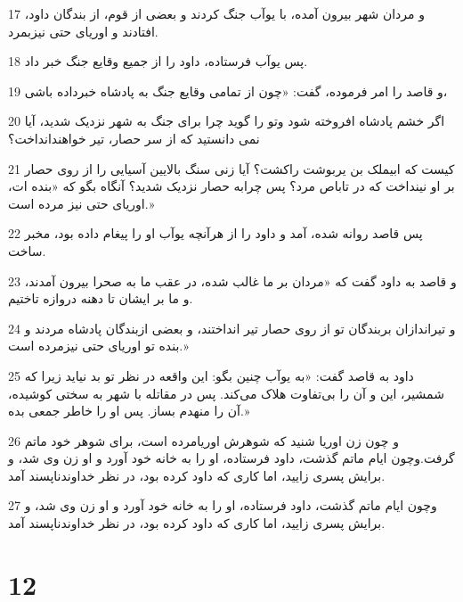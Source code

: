 \par 17 و مردان شهر بیرون آمده، با یوآب جنگ کردند و بعضی از قوم، از بندگان داود، افتادند و اوریای حتی نیزبمرد.
\par 18 پس یوآب فرستاده، داود را از جمیع وقایع جنگ خبر داد.
\par 19 و قاصد را امر فرموده، گفت: «چون از تمامی وقایع جنگ به پادشاه خبرداده باشی،
\par 20 اگر خشم پادشاه افروخته شود وتو را گوید چرا برای جنگ به شهر نزدیک شدید، آیا نمی دانستید که از سر حصار، تیر خواهندانداخت؟
\par 21 کیست که ابیملک بن یربوشت راکشت؟ آیا زنی سنگ بالایین آسیایی را از روی حصار بر او نینداخت که در تاباص مرد؟ پس چرابه حصار نزدیک شدید؟ آنگاه بگو که «بنده ات، اوریای حتی نیز مرده است.»
\par 22 پس قاصد روانه شده، آمد و داود را از هرآنچه یوآب او را پیغام داده بود، مخبر ساخت.
\par 23 و قاصد به داود گفت که «مردان بر ما غالب شده، در عقب ما به صحرا بیرون آمدند، و ما بر ایشان تا دهنه دروازه تاختیم.
\par 24 و تیراندازان بربندگان تو از روی حصار تیر انداختند، و بعضی ازبندگان پادشاه مردند و بنده تو اوریای حتی نیزمرده است.»
\par 25 داود به قاصد گفت: «به یوآب چنین بگو: این واقعه در نظر تو بد نیاید زیرا که شمشیر، این و آن را بی‌تفاوت هلاک می‌کند. پس در مقاتله با شهر به سختی کوشیده، آن را منهدم بساز. پس او را خاطر جمعی بده.»
\par 26 و چون زن اوریا شنید که شوهرش اوریامرده است، برای شوهر خود ماتم گرفت.وچون ایام ماتم گذشت، داود فرستاده، او را به خانه خود آورد و او زن وی شد، و برایش پسری زایید، اما کاری که داود کرده بود، در نظر خداوندناپسند آمد.
\par 27 وچون ایام ماتم گذشت، داود فرستاده، او را به خانه خود آورد و او زن وی شد، و برایش پسری زایید، اما کاری که داود کرده بود، در نظر خداوندناپسند آمد.
 
\chapter{12}

